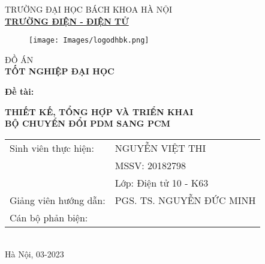 \begin{titlepage}

\begin{center}\vspace{-15pt}
TRƯỜNG ĐẠI HỌC BÁCH KHOA HÀ NỘI \\
\textbf{\underline{\fontsize{16pt}{0pt}\selectfont TRƯỜNG ĐIỆN - ĐIỆN TỬ}}

\vspace{0.5cm}
\begin{figure}[H]
    \centering
    \texttt{[image: Images/logodhbk.png]}
\end{figure}
\vspace{1.2cm}

\fontsize{24pt}{0pt}\selectfont ĐỒ ÁN \\[12pt] 
\textbf{\fontsize{32pt}{0pt}\selectfont TỐT NGHIỆP ĐẠI HỌC} 
\vspace{1.2cm}

\end{center}
\hspace{12pt}\textbf{\fontsize{14pt}{0pt}\selectfont Đề tài:}
\begin{center}
    \textbf{\fontsize{20pt}{0pt}\selectfont THIẾT KẾ, TỔNG HỢP VÀ TRIỂN KHAI \\}
   \textbf{\fontsize{20pt}{0pt}\selectfont BỘ CHUYỂN ĐỔI PDM SANG PCM\\}

    
\vspace{2cm}    

    \begin{tabular}{ l l }
        \fontsize{14pt}{0pt}\selectfont Sinh viên thực hiện: & \fontsize{14pt}{0pt}\selectfont NGUYỄN VIỆT THI  \vspace{0.2cm} \\ 
        & \fontsize{14pt}{0pt}\selectfont MSSV: 20182798 \vspace{0.2cm}\\
        & \fontsize{14pt}{0pt}\selectfont Lớp: Điện tử 10 - K63 \vspace{0.2cm}\\
        \fontsize{14pt}{0pt}\selectfont Giảng viên hướng dẫn: &  \fontsize{14pt}{0pt}\selectfont  PGS. TS. NGUYỄN ĐỨC MINH\vspace{0.2cm}\\
                \fontsize{14pt}{0pt}\selectfont Cán bộ phản biện: &  \fontsize{14pt}{0pt}\selectfont  
    \end{tabular} \\[3cm]
    \fontsize{14pt}{0pt}\selectfont Hà Nội, 03-2023
\end{center}
\end{titlepage} \cleardoublepage